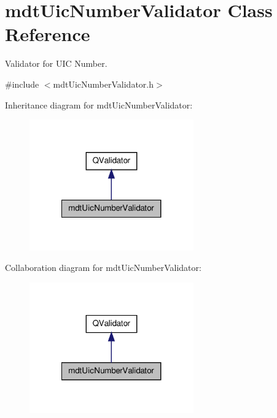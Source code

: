 \hypertarget{classmdt_uic_number_validator}{\section{mdt\-Uic\-Number\-Validator Class Reference}
\label{classmdt_uic_number_validator}
}


Validator for U\-I\-C Number.  




{\ttfamily \#include $<$mdt\-Uic\-Number\-Validator.\-h$>$}



Inheritance diagram for mdt\-Uic\-Number\-Validator\-:\nopagebreak
\begin{figure}[H]
\begin{center}
\leavevmode
\includegraphics[width=200pt]{classmdt_uic_number_validator__inherit__graph}
\end{center}
\end{figure}


Collaboration diagram for mdt\-Uic\-Number\-Validator\-:\nopagebreak
\begin{figure}[H]
\begin{center}
\leavevmode
\includegraphics[width=200pt]{classmdt_uic_number_validator__coll__graph}
\end{center}
\end{figure}
